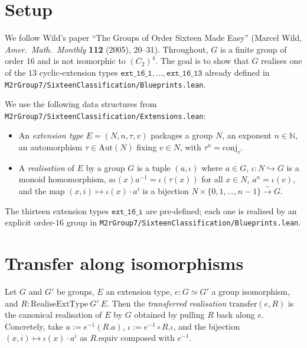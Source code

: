 


\section{Setup}

We follow Wild's paper ``The Groups of Order Sixteen Made Easy'' (Marcel Wild,
\emph{Amer.\ Math.\ Monthly} \textbf{112} (2005), 20--31). Throughout, $G$ is a
finite group of order $16$ and is not isomorphic to $(C_2)^4$. The goal is to
show that $G$ realises one of the $13$ cyclic-extension types
$\mathtt{ext\_16\_1}, \dots, \mathtt{ext\_16\_13}$ already defined in
\texttt{M2rGroup7/SixteenClassification/Blueprints.lean}.

We use the following data structures from
\texttt{M2rGroup7/SixteenClassification/Extensions.lean}:

\begin{itemize}
\item An \emph{extension type} $E = (N, n, \tau, v)$ packages a group $N$, an
exponent $n \in \mathbb{N}$, an automorphism $\tau \in \mathrm{Aut}(N)$ fixing
$v \in N$, with $\tau^n = \mathrm{conj}_v$.
\item A \emph{realisation} of $E$ by a group $G$ is a tuple
$(a, \iota)$ where $a \in G$, $\iota : N \hookrightarrow G$ is a monoid
homomorphism, $a \iota(x) a^{-1} = \iota(\tau(x))$ for all $x \in N$,
$a^n = \iota(v)$, and the map $(x, i) \mapsto \iota(x) \cdot a^i$ is a bijection
$N \times \{0, 1, \dots, n-1\} \xrightarrow{\sim} G$.
\end{itemize}

The thirteen extension types $\mathtt{ext\_16\_i}$ are pre-defined; each one is
realised by an explicit order-$16$ group in
\texttt{M2rGroup7/SixteenClassification/Blueprints.lean}.

\section{Transfer along isomorphisms}

\begin{definition}
  \label{def:realise-transfer}
  \leanok
  Let $G$ and $G'$ be groups, $E$ an extension type, $e : G \simeq G'$ a group
  isomorphism, and $R : \mathrm{RealiseExtType}~G'~E$. Then the
  \emph{transferred realisation} $\mathrm{transfer}(e, R)$ is the canonical
  realisation of $E$ by $G$ obtained by pulling $R$ back along $e$.
  Concretely, take $a := e^{-1}(R.a)$, $\iota := e^{-1} \circ R.\iota$,
  and the bijection $(x, i) \mapsto \iota(x) \cdot a^i$ as $R.\mathrm{equiv}$
  composed with $e^{-1}$.
\end{definition}

